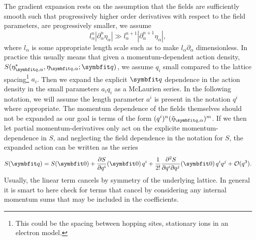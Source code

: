 The gradient expansion rests on the assumption that the fields are sufficiently smooth such that progressively higher order derivatives with
respect to the field parameters, are progressively smaller,
\ie we assume 
\begin{equation}
    \label{eq:Field:Grad:gradientComparison}
    l_\alpha^n|\partial_\alpha^n\eta_\alpha| \gg l_\alpha^{n+1}|\partial_\alpha^{n+1}\eta_\alpha|,
\end{equation}
where $l_\alpha$ is some appropriate length scale such as to make $l_\alpha\partial_\alpha$ dimensionless.
In practice this usually means that given a momentum-dependent action density, $S(\eta_{\v{q},\alpha}^\ast,\eta_{\v{q},\alpha};\v{q})$, we assume $q_i$ small compared to the lattice
spacing\footnote{This could be the spacing between hopping sites, \ie stationary ions in an electron model.} $a_i$. Then we expand the
explicit $\v{q}$ dependence in the action density in the small parameters $a_iq_i$ as a McLaurien series. In the following notation, we will
assume the length parameter $a^i$ is present in the notation $q^i$ where appropriate. The momentum dependence of the fields
themselves should not be expanded as our goal is terms of the form $(q^i)^n(\tilde{\eta}_{\v{q},\alpha})^m$. If we then let partial momentum-derivatives
only act on the explicite momentum-dependence in $S$, and neglecting the field dependence in the notation
for $S$, the expanded action can be written as the series
\begin{equation}
    \label{eq:Field:Grad:actionExpansion}
    S(\v{q}) = S(\v{0}) + \frac{\partial S}{\partial q^i}(\v{0})\,q^i + \frac{1}{2!}\frac{\partial^2S}{\partial q^i\partial q^j}(\v{0})\,q^iq^j + \mathcal{O}(q^3).
\end{equation}
Usually, the linear term cancels by symmetry of the underlying lattice. In general it is smart to here check for terms that cancel by considering any internal
momentum sums that may be included in the coefficients.


